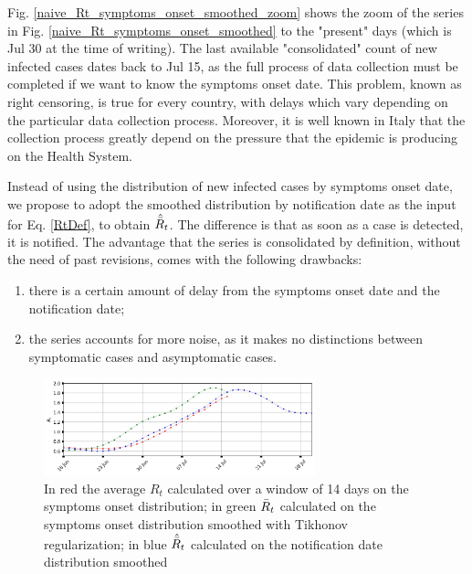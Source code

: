 \documentclass[graybox]{svmult}
\begin{document}
Fig. \ref{naive_Rt_symptoms_onset_smoothed_zoom} shows the zoom of the series in Fig. \ref{naive_Rt_symptoms_onset_smoothed} to the "present" days (which is Jul 30 at the time of writing). The last available "consolidated" count of new infected cases dates back to Jul 15, as the full process of data collection must be completed if we want to know the symptoms onset date. This problem, known as right censoring, is true for every country, with delays which vary depending on the particular data collection process. Moreover, it is well known in Italy that the collection process greatly depend on the pressure that the epidemic is producing on the Health System.

Instead of using the distribution of new infected cases by symptoms onset date, we propose to adopt the smoothed distribution by notification date as the input for Eq. \ref{RtDef}, to obtain $\hat{\Bar{R}}_{t}$. The difference is that as soon as a case is detected, it is notified. The advantage that the series is consolidated by definition, without the need of past revisions, comes with the following drawbacks:
\begin{enumerate}
    \item there is a certain amount of delay from the symptoms onset date and the notification date;
    \item the series accounts for more noise, as it makes no distinctions between symptomatic cases and asymptomatic cases.
\end{enumerate}

\begin{figure}[t]
\center
\includegraphics[width=0.7\textwidth]{Rt_images/naive_Rt_symptoms_onset_vs_notification.jpg}
\caption{In red the average $R_t$ calculated over a window of 14 days on the symptoms onset distribution; in green $\Bar{R}_{t}$ calculated on the symptoms onset distribution smoothed with Tikhonov regularization; in blue $\hat{\Bar{R}}_{t}$ calculated on the notification date distribution smoothed}
\label{naive_Rt_symptoms_onset_vs_notification}
\end{figure}
\end{document}
